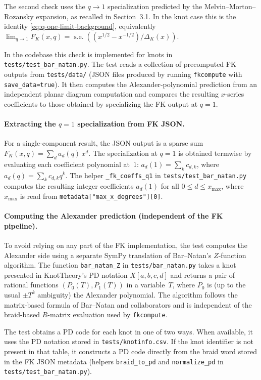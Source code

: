 \documentclass[twocolumn]{article}
\begin{document}
The second check uses the $q\to 1$ specialization predicted by the
Melvin--Morton--Rozansky expansion, as recalled in
Section~3.1.  In the knot case this is the identity
\eqref{eq:q-one-limit-background}, equivalently
\(\lim_{q\to 1}F_K(x,q)=\operatorname{s.e.}((x^{1/2}-x^{-1/2})/\Delta_K(x))\).

In the codebase this check is implemented for knots in
\texttt{tests/test\_bar\_natan.py}.
The test reads a collection of precomputed FK outputs from \texttt{tests/data/}
(JSON files produced by running \texttt{fkcompute} with \texttt{save\_data=true}).
It then computes the Alexander-polynomial prediction from an independent planar
diagram computation and compares the resulting $x$-series coefficients to those
obtained by specializing the FK output at $q=1$.

\paragraph{Extracting the $q=1$ specialization from FK JSON.}
For a single-component result, the JSON output is a sparse sum
\(F_K(x,q)=\sum_d a_d(q)\,x^d\).
The specialization at $q=1$ is obtained termwise by evaluating each coefficient
polynomial at~$1$:
\(a_d(1)=\sum_k c_{d,k}\), where \(a_d(q)=\sum_k c_{d,k}q^k\).
The helper \texttt{\_fk\_coeffs\_q1} in \texttt{tests/test\_bar\_natan.py} computes
the resulting integer coefficients \(a_d(1)\) for all $0\le d\le x_{\max}$,
where \(x_{\max}\) is read from \texttt{metadata["max\_x\_degrees"][0]}.

\paragraph{Computing the Alexander prediction (independent of the FK pipeline).}
To avoid relying on any part of the FK implementation, the test computes the
Alexander side using a separate SymPy translation of Bar--Natan's $Z$-function
algorithm.
The function \texttt{bar\_natan\_Z} in \texttt{tests/bar\_natan.py} takes a knot
presented in KnotTheory's PD notation \(X[a,b,c,d]\) and returns a pair of
rational functions \((P_0(T),P_1(T))\) in a variable~$T$, where $P_0$ is (up to
the usual \(\pm T^k\) ambiguity) the Alexander polynomial.
The algorithm follows the matrix-based formula of Bar--Natan and collaborators
and is independent of the braid-based $R$-matrix evaluation used by
\texttt{fkcompute}.

The test obtains a PD code for each knot in one of two ways.
When available, it uses the PD notation stored in \texttt{tests/knotinfo.csv}.
If the knot identifier is not present in that table, it constructs a PD code
directly from the braid word stored in the FK JSON metadata (helpers
\texttt{braid\_to\_pd} and \texttt{normalize\_pd} in
\texttt{tests/test\_bar\_natan.py}).
\end{document}

